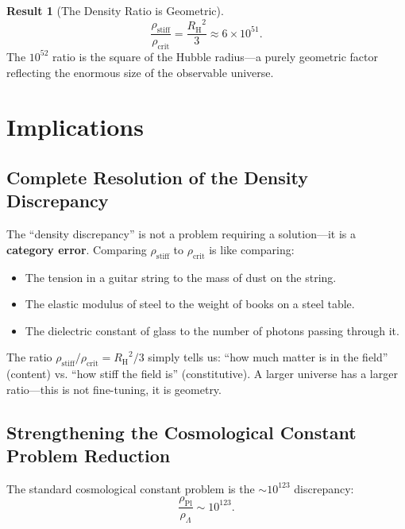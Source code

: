 \documentclass[11pt,a4paper]{article}
\newcommand{\rhocrit}{\ensuremath{\rho_{\mathrm{crit}}}}
\newcommand{\rhostiff}{\ensuremath{\rho_{\mathrm{stiff}}}}
\newcommand{\rhoPl}{\ensuremath{\rho_{\mathrm{Pl}}}}
\newcommand{\RH}{\ensuremath{R_{\mathrm{H}}}}
\theoremstyle{definition}
\newtheorem{result}{Result}
\begin{document}
\begin{result}[The Density Ratio is Geometric]
\begin{equation}
\boxed{\frac{\rhostiff}{\rhocrit} = \frac{\RH^2}{3} \approx 6 \times 10^{51}.}
\end{equation}
The $10^{52}$ ratio is the square of the Hubble radius---a purely geometric factor reflecting the enormous size of the observable universe.
\end{result}

\section{Implications}
\label{sec:implications}

\subsection{Complete Resolution of the Density Discrepancy}
\label{sec:complete_resolution}

The ``density discrepancy'' is not a problem requiring a solution---it is a \textbf{category error}. Comparing $\rhostiff$ to $\rhocrit$ is like comparing:
\begin{itemize}
    \item The tension in a guitar string to the mass of dust on the string.
    \item The elastic modulus of steel to the weight of books on a steel table.
    \item The dielectric constant of glass to the number of photons passing through it.
\end{itemize}

The ratio $\rhostiff/\rhocrit = \RH^2/3$ simply tells us: ``how much matter is in the field'' (content) vs. ``how stiff the field is'' (constitutive). A larger universe has a larger ratio---this is not fine-tuning, it is geometry.

\subsection{Strengthening the Cosmological Constant Problem Reduction}
\label{sec:cc_reduction}

The standard cosmological constant problem is the $\sim 10^{123}$ discrepancy:
\begin{equation}
\frac{\rhoPl}{\rho_\Lambda} \sim 10^{123}.
\end{equation}
\end{document}

